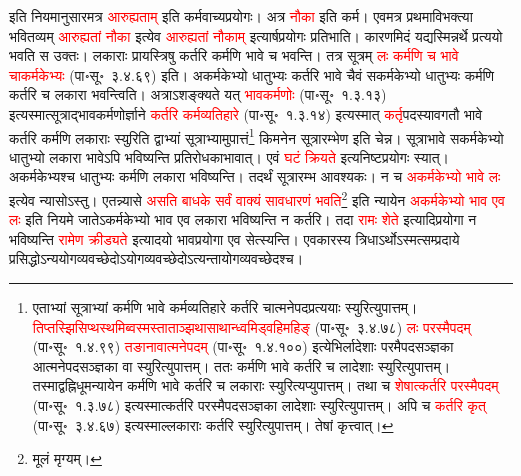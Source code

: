 \begin{sloppypar}\justifying\noindent इति नियमानुसारमत्र \textcolor{red}{आरुह्यताम्‌} इति कर्म\-वाच्य\-प्रयोगः। अत्र \textcolor{red}{नौका} इति कर्म। एवमत्र प्रथमा\-विभक्त्या भवितव्यम् \textcolor{red}{आरुह्यतां नौका} इत्येव \textcolor{red}{आरुह्यतां नौकाम्‌} इत्यार्ष\-प्रयोगः प्रतिभाति। कारणमिदं यद्यस्मिन्नर्थे प्रत्ययो भवति स उक्तः। लकाराः प्रायस्त्रिषु कर्तरि कर्मणि भावे च भवन्ति। तत्र सूत्रम् \textcolor{red}{लः कर्मणि च भावे चाकर्मकेभ्यः} (पा॰सू॰~३.४.६९) इति। अकर्मकेभ्यो धातुभ्यः कर्तरि भावे चैवं सकर्मकेभ्यो धातुभ्यः कर्मणि कर्तरि च लकारा भवन्त्विति। अत्राऽशङ्क्यते यत् \textcolor{red}{भाव\-कर्मणोः} (पा॰सू॰~१.३.१३) इत्यस्मात्सूत्राद्भाव\-कर्मणोर्ज्ञाने \textcolor{red}{कर्तरि कर्मव्यतिहारे} (पा॰सू॰~१.३.१४) इत्यस्मात् \textcolor{red}{कर्तृ}\-पदस्यावगतौ भावे कर्तरि कर्मणि लकाराः स्युरिति द्वाभ्यां सूत्राभ्यामुपात्तं\footnote{एताभ्यां सूत्राभ्यां कर्मणि भावे कर्म\-व्यतिहारे कर्तरि चात्मने\-पद\-प्रत्ययाः स्युरित्युपात्तम्। \textcolor{red}{तिप्तस्झि\-सिप्थस्थमिब्वस्मस्ताताञ्झ\-थासाथान्ध्वमिड्वहिमहिङ्} (पा॰सू॰~३.४.७८) \textcolor{red}{लः परस्मैपदम्} (पा॰सू॰~१.४.९९) \textcolor{red}{तङानावात्मनेपदम्} (पा॰सू॰~१.४.१००) इत्येभिर्लादेशाः परमैपद\-सञ्ज्ञका आत्मने\-पद\-सञ्ज्ञका वा स्युरित्युपात्तम्। ततः कर्मणि भावे कर्तरि च लादेशाः स्युरित्युपात्तम्। तस्माद्वह्नि\-धूम\-न्यायेन कर्मणि भावे कर्तरि च लकाराः स्युरित्यप्युपात्तम्। तथा च \textcolor{red}{शेषात्कर्तरि परस्मैपदम्‌} (पा॰सू॰~१.३.७८) इत्यस्मात्कर्तरि परस्मैपद\-सञ्ज्ञका लादेशाः स्युरित्युपात्तम्। अपि च \textcolor{red}{कर्तरि कृत्‌} (पा॰सू॰~३.४.६७) इत्यस्माल्लकाराः कर्तरि स्युरित्युपात्तम्। तेषां कृत्त्वात्।} किमनेन सूत्रारम्भेण इति चेन्न। सूत्राभावे सकर्मकेभ्यो धातुभ्यो लकारा भावेऽपि भविष्यन्ति प्रतिरोधकाभावात्। एवं \textcolor{red}{घटं क्रियते} इत्यनिष्ट\-प्रयोगः स्यात्। अकर्मकेभ्यश्च धातुभ्यः कर्मणि लकारा भविष्यन्ति। तदर्थं सूत्रारम्भ आवश्यकः। न च \textcolor{red}{अकर्मकेभ्यो भावे लः} इत्येव न्यासोऽस्तु। एतन्न्यासे \textcolor{red}{असति बाधके सर्वं वाक्यं सावधारणं भवति}\footnote{मूलं मृग्यम्।} इति न्यायेन \textcolor{red}{अकर्मकेभ्यो भाव एव लः} इति नियमे जातेऽकर्मकेभ्यो भाव एव लकारा भविष्यन्ति न कर्तरि। तदा \textcolor{red}{रामः शेते} इत्यादि\-प्रयोगा न भविष्यन्ति \textcolor{red}{रामेण क्रीड्यते} इत्यादयो भाव\-प्रयोगा एव सेत्स्यन्ति। एव\-कारस्य त्रिधाऽर्थोऽस्मत्सम्प्रदाये प्रसिद्धोऽन्ययोग\-व्यवच्छेदोऽयोग\-व्यवच्छेदोऽत्यन्तायोग\-व्यवच्छेदश्च। 

\end{sloppypar}
